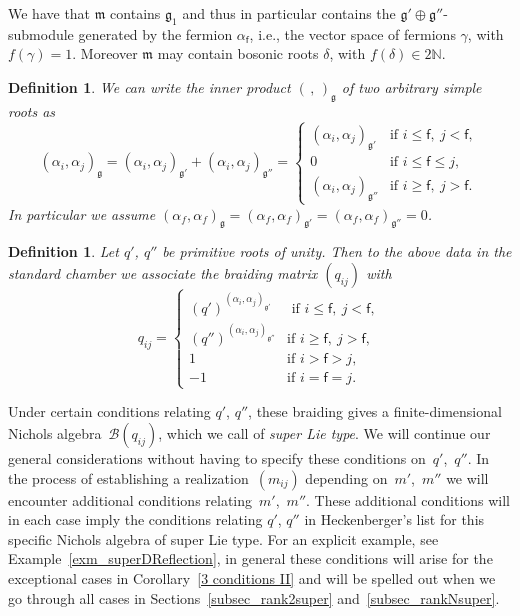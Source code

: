\documentclass[10pt,a4paper]{amsart}
\numberwithin{equation}{section}
\newtheorem{defin}[teo]{Definition}
\newcommand{\N}{\mathbb{N}}
\newcommand{\f}{\mathsf{f}}
\begin{document}
We have that $\mathfrak{m}$ contains $\mathfrak{g_1}$ and thus in particular contains the $\mathfrak{g'} \oplus \mathfrak{g''}$-submodule generated by the fermion $\alpha_\f$, i.e., the vector space of fermions $\gamma$, with $f(\gamma) =1$.
Moreover $\mathfrak{m}$ may contain bosonic roots $\delta$, with $f(\delta)\in 2\N$.
\begin{defin}We can write the inner product $\left( \,,\,\right)_\mathfrak{g}$ of two arbitrary simple roots as \[(\alpha_{i}, \alpha_{j})_\mathfrak{g} = (\alpha_{i}, \alpha_{j})_\mathfrak{g'}+(\alpha_{i}, \alpha_{j})_\mathfrak{g''}= \begin{cases} (\alpha_{i}, \alpha_{j})_\mathfrak{g'}& \text{if } i \leq \f ,\  j < \f, \\
0 & \text{if } i \leq \f \leq j, \\
(\alpha_{i}, \alpha_{j})_\mathfrak{g''}& \text{if } i \geq \f ,\  j > \f.
\end{cases}\]
In particular we assume $(\alpha_{f}, \alpha_{f})_\mathfrak{g}= (\alpha_{f}, \alpha_{f})_\mathfrak{g'} = (\alpha_{f}, \alpha_{f})_\mathfrak{g''}=0$.
\end{defin}

\begin{defin}\label{defbraidSuper} Let $q'$, $q''$ be primitive roots of unity.
Then to the above data in the standard chamber we associate the braiding matrix $(q_{ij})$
with
\[q_{ij} =
\begin{cases} (q')^{(\alpha_{i}, \alpha_{j})_\mathfrak{g'}}&\text{ if } i \leq \f ,\  j < \f, \\
(q'')^{(\alpha_{i}, \alpha_{j})_\mathfrak{g''}}& \text{if } i \geq \f ,\  j > \f, \\
  1 & \text{if } i>\f>j, \\
-1 & \text{if } i=\f=j.
\end{cases}\]
\end{defin}

Under certain conditions relating $q'$, $q''$, these braiding gives a finite-dimensional Nichols algebra~$\mathcal{B}(q_{ij})$, which we call of \emph{super Lie type}. We will continue our general considerations without having to specify these conditions on~$q'$,~$q''$. In the process of establishing a realization~$(m_{ij})$ depending on~$m'$,~$m''$ we will encounter additional conditions relating~$m'$,~$m''$. These additional conditions will in each case imply the conditions relating $q'$, $q''$ in Heckenberger's list for this specific Nichols algebra of super Lie type. For an explicit example, see Example~\ref{exm_superDReflection}, in general these conditions will arise for the exceptional cases in Corollary~\ref{3 conditions II} and will be spelled out when we go through all cases in Sections~\ref{subsec_rank2super} and~\ref{subsec_rankNsuper}.
\end{document}
